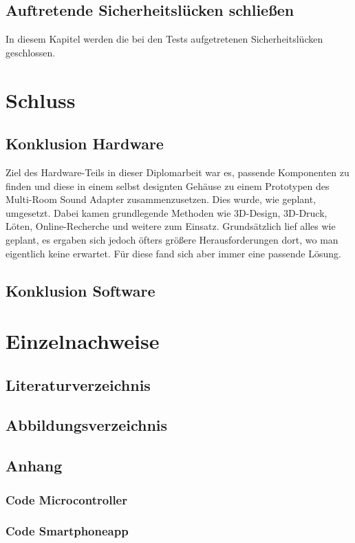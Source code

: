 \documentclass[11pt, twoside]{article}
\begin{document}
\subsection{Auftretende Sicherheitslücken schließen}
In diesem Kapitel werden die bei den Tests aufgetretenen Sicherheitslücken geschlossen.
\section{Schluss}
\subsection{Konklusion Hardware}
Ziel des Hardware-Teils in dieser Diplomarbeit war es, passende Komponenten zu finden und diese in einem selbst designten Gehäuse zu einem Prototypen des Multi-Room Sound Adapter zusammenzusetzen. Dies wurde, wie geplant, umgesetzt. Dabei kamen grundlegende Methoden wie 3D-Design, 3D-Druck, Löten, Online-Recherche und weitere zum Einsatz. Grundsätzlich lief alles wie geplant, es ergaben sich jedoch öfters größere Herausforderungen dort, wo man eigentlich keine erwartet. Für diese fand sich aber immer eine passende Lösung.
\subsection{Konklusion Software}
\section{Einzelnachweise}
\subsection{Literaturverzeichnis}
\subsection{Abbildungsverzeichnis}
\listoffigures
\subsection{Anhang}
\subsubsection{Code Microcontroller}
\subsubsection{Code Smartphoneapp}
\end{document}
